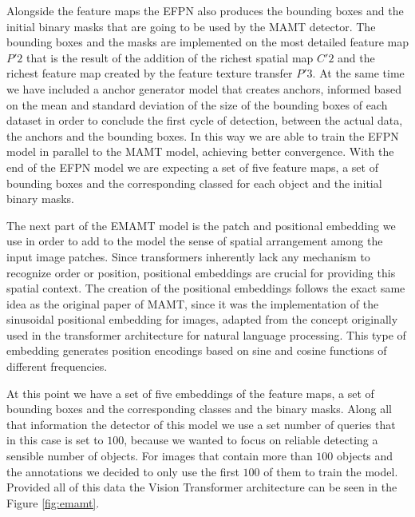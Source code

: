 Alongside the feature maps the EFPN also produces the bounding boxes and the initial binary masks that are going to be used by the MAMT detector. The 
bounding boxes and the masks are implemented on the most detailed feature map $P'2$ that is the result of the addition of the richest spatial map $C'2$ 
and the richest feature map created by the feature texture transfer $P'3$. At the same time we have included a anchor generator model that creates anchors, 
informed based on the mean and standard deviation of the size of the bounding boxes of each dataset in order to conclude the first cycle of detection, between the 
actual data, the anchors and the bounding boxes. In this way we are able to train the EFPN model in parallel to the MAMT model, achieving better convergence.
With the end of the EFPN model we are expecting a set of five  feature maps, a set of bounding boxes and the corresponding classed for each object 
and the initial binary masks. 

The next part of the EMAMT model is the patch and positional embedding we use in order to add to the model the  sense of spatial arrangement among the input 
image patches. Since transformers inherently lack any mechanism to recognize order or position, positional embeddings are crucial for providing this spatial 
context. The creation of the positional embeddings follows the exact same idea as the original paper of MAMT, since it was the implementation of the
sinusoidal positional embedding for images, adapted from the concept originally used in the transformer architecture for natural language processing.
This type of embedding generates position encodings based on sine and cosine functions of different frequencies.


At this point we have a set of five embeddings of the feature maps, a set of bounding boxes and the corresponding classes and the binary masks. Along all
that information the detector of this model we use a set number of queries that in this case is set to $100$, because we wanted to focus on reliable 
detecting a sensible number of objects. For images that contain more than $100$ objects and the annotations we decided to only use the first $100$ of them 
to train the model. Provided all of this data the Vision Transformer architecture can be seen in the Figure \ref{fig:emamt}.

